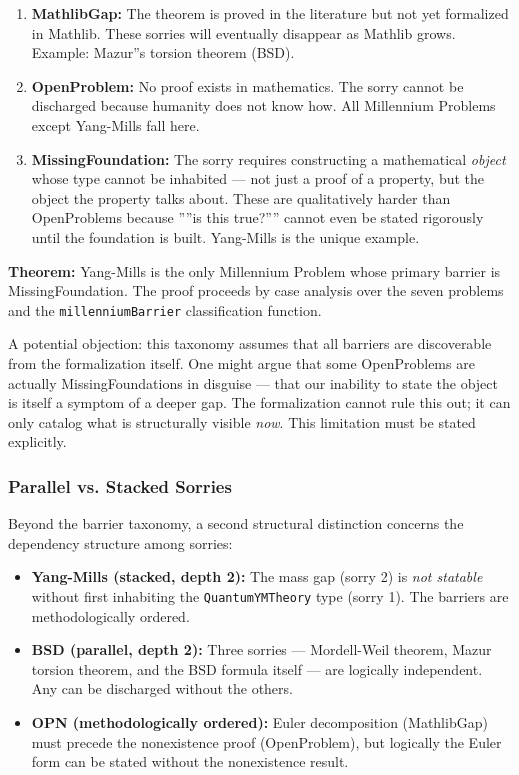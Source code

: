 \documentclass[12pt,a4paper]{article}
\begin{document}
\begin{enumerate}
    \item \textbf{MathlibGap:} The theorem is proved in the literature but not yet formalized in Mathlib. These sorries will eventually disappear as Mathlib grows. Example: Mazur''s torsion theorem (BSD).
    \item \textbf{OpenProblem:} No proof exists in mathematics. The sorry cannot be discharged because humanity does not know how. All Millennium Problems except Yang-Mills fall here.
    \item \textbf{MissingFoundation:} The sorry requires constructing a mathematical \emph{object} whose type cannot be inhabited --- not just a proof of a property, but the object the property talks about. These are qualitatively harder than OpenProblems because ''''is this true?'''' cannot even be stated rigorously until the foundation is built. Yang-Mills is the unique example.
\end{enumerate}

\textbf{Theorem:} Yang-Mills is the only Millennium Problem whose primary barrier is MissingFoundation. The proof proceeds by case analysis over the seven problems and the \texttt{millenniumBarrier} classification function.

A potential objection: this taxonomy assumes that all barriers are discoverable from the formalization itself. One might argue that some OpenProblems are actually MissingFoundations in disguise --- that our inability to state the object is itself a symptom of a deeper gap. The formalization cannot rule this out; it can only catalog what is structurally visible \emph{now}. This limitation must be stated explicitly.

\subsubsection{Parallel vs. Stacked Sorries}

Beyond the barrier taxonomy, a second structural distinction concerns the dependency structure among sorries:

\begin{itemize}
    \item \textbf{Yang-Mills (stacked, depth 2):} The mass gap (sorry 2) is \emph{not statable} without first inhabiting the \texttt{QuantumYMTheory} type (sorry 1). The barriers are methodologically ordered.
    \item \textbf{BSD (parallel, depth 2):} Three sorries --- Mordell-Weil theorem, Mazur torsion theorem, and the BSD formula itself --- are logically independent. Any can be discharged without the others.
    \item \textbf{OPN (methodologically ordered):} Euler decomposition (MathlibGap) must precede the nonexistence proof (OpenProblem), but logically the Euler form can be stated without the nonexistence result.
\end{itemize}
\end{document}
